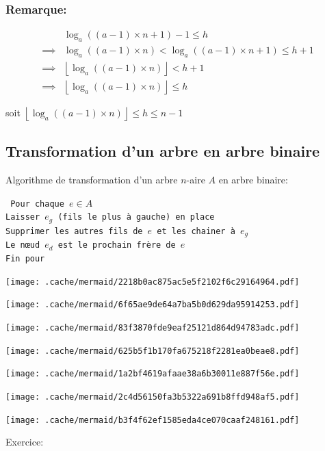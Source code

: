 \hypertarget{remarque}{%
\subsubsection{Remarque:}\label{remarque}}

\begin{align*}
    &\log_a((a-1)\times n + 1)  - 1 \le h\\
    \implies& \log_a((a-1)\times n) < \log_a ((a-1) \times n + 1) \le h+1\\
    \implies& \left\lfloor \log_a((a-1)\times n) \right\rfloor< h+1\\
    \implies&\left\lfloor \log_a((a-1)\times n) \right\rfloor \le h
\end{align*}

soit \(\left\lfloor \log_a((a-1)\times n) \right\rfloor\le h \le n-1\)

\hypertarget{transformation-dun-arbre-en-arbre-binaire}{%
\subsection{Transformation d'un arbre en arbre
binaire}\label{transformation-dun-arbre-en-arbre-binaire}}

Algorithme de transformation d'un arbre \(n\)-aire \(A\) en arbre
binaire:

\tt
    Pour chaque $e \in A$\\
        Laisser $e_g$ (fils le plus à gauche) en place\\
        Supprimer les autres fils de $e$ et les chainer à $e_g$\\
        Le nœud $e_d$ est le prochain frère de $e$\\
    Fin pour
\rm

\texttt{[image: .cache/mermaid/2218b0ac875ac5e5f2102f6c29164964.pdf]}

\texttt{[image: .cache/mermaid/6f65ae9de64a7ba5b0d629da95914253.pdf]}

\texttt{[image: .cache/mermaid/83f3870fde9eaf25121d864d94783adc.pdf]}

\texttt{[image: .cache/mermaid/625b5f1b170fa675218f2281ea0beae8.pdf]}

\texttt{[image: .cache/mermaid/1a2bf4619afaae38a6b30011e887f56e.pdf]}

\texttt{[image: .cache/mermaid/2c4d56150fa3b5322a691b8ffd948af5.pdf]}

\texttt{[image: .cache/mermaid/b3f4f62ef1585eda4ce070caaf248161.pdf]}

Exercice:

